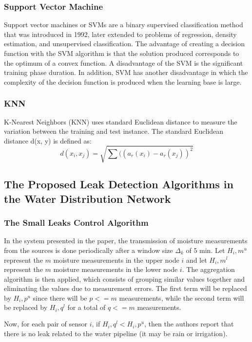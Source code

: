 \documentclass[draft, {\secondLanguage}, english]{volcanica-template}
\begin{document}
\subsubsection{Support Vector Machine}
Support vector machines or SVMs are a binary supervised classification method that was introduced in 1992, later extended to problems of regression, density estimation, and unsupervised classification. The advantage of creating a decision function with the SVM algorithm is that the solution produced corresponds to the optimum of a convex function. A disadvantage of the SVM is the significant training phase duration. In addition, SVM has another disadvantage in which the complexity of the decision function is produced when the learning base is large.

\subsubsection{KNN}
K-Nearest Neighbors (KNN) uses standard Euclidean distance to measure the variation between the training and test instance. The standard Euclidean distance d(x, y) is defined as:
\begin{equation}
    d(x_i,x_j) = \sqrt{\sum((a_r(x_i) - a_r(x_j))^2}
\end{equation}

\subsection{The Proposed Leak Detection Algorithms in the Water Distribution Network}
\subsubsection{The Small Leaks Control Algorithm}
In the system presented in the paper, the transmission of moisture measurements from the sources is done periodically after a window size $\Delta_k$ of 5 min. Let $H_i,m^u$ represent the $m$ moisture measurements in the upper node $i$ and let $H_i,m^l$ represent the $m$ moisture measurements in the lower node $i$. The aggregation algorithm is then applied, which consists of grouping similar values together and eliminating the values due to measurement errors. The first term will be replaced by $H_i,p^u$ since there will be $p<=m$ measurements, while the second term will be replaced by $H_i,q^l$ for a total of $q<=m$ measurements.

Now, for each pair of sensor $i$, if $H_i,q^l < H_i,p^u$, then the authors report that there is no leak related to the water pipeline (it may be rain or irrigation).
\end{document}

